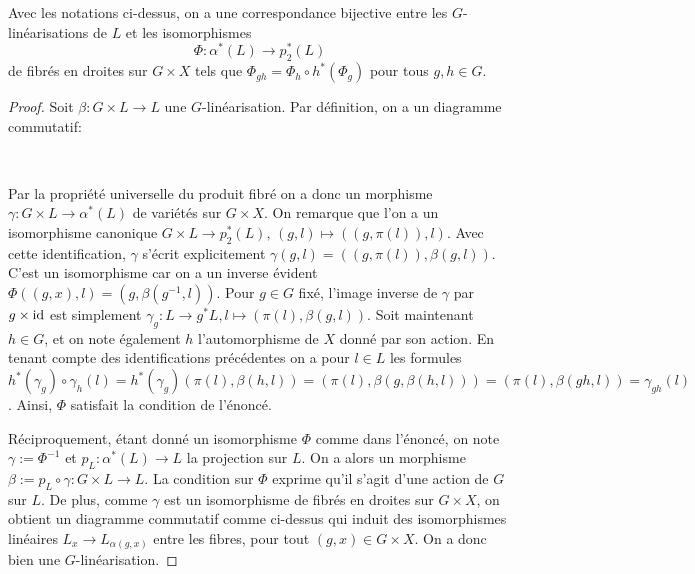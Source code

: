 \begin{lem}\label{CritereExistenceGLin}
Avec les notations ci-dessus, on a une correspondance bijective entre les $G$-linéarisations de $L$ et les isomorphismes
$$\Phi: \alpha^*(L)\rightarrow p_2^*(L)$$
de fibrés en droites sur $G\times X$ tels que $\Phi_{gh}=\Phi_h\circ h^*(\Phi_g)$ pour tous $g,h\in G$.
\end{lem}
\begin{proof}
Soit $\beta:G\times L\rightarrow L$ une $G$-linéarisation. Par définition, on a un diagramme commutatif:
	\begin{center}
	\\
	\end{center}
Par la propriété universelle du produit fibré on a donc un morphisme $\gamma:G\times L\rightarrow\alpha^*(L)$ de variétés sur $G\times X$. On remarque que l'on a un isomorphisme canonique $G\times L\rightarrow p_2^*(L),\, (g,l)\mapsto ((g,\pi (l)),l)$. Avec cette identification, $\gamma$ s'écrit explicitement $\gamma(g,l)=((g,\pi(l)),\beta(g,l))$. C'est un isomorphisme car on a un inverse évident $\Phi((g,x),l)=(g,\beta(g^{-1},l))$. Pour $g\in G$ fixé, l'image inverse de $\gamma$ par $g\times \operatorname{id}$ est simplement $\gamma_g:L\rightarrow g^*L, l\mapsto (\pi(l),\beta(g,l))$. Soit maintenant $h\in G$, et on note également $h$ l'automorphisme de $X$ donné par son action. En tenant compte des identifications précédentes on a pour $l\in L$ les formules $h^*(\gamma_g)\circ\gamma_h(l)=h^*(\gamma_g)(\pi(l),\beta(h,l))=(\pi(l),\beta(g,\beta(h,l)))=(\pi(l),\beta(gh,l))=\gamma_{gh}(l)$. Ainsi, $\Phi$ satisfait la condition de l'énoncé.

Réciproquement, étant donné un isomorphisme $\Phi$ comme dans l'énoncé, on note $\gamma:=\Phi^{-1}$ et $p_L:\alpha^*(L)\rightarrow L$ la projection sur $L$. On a alors un morphisme $\beta:=p_L\circ\gamma : G\times L \rightarrow L$. La condition sur $\Phi$ exprime qu'il s'agit d'une action de $G$  sur $L$. De plus, comme $\gamma$ est un isomorphisme de fibrés en droites sur $G\times X$, on obtient un diagramme commutatif comme ci-dessus qui induit des isomorphismes linéaires $L_x\rightarrow L_{\alpha(g,x)}$ entre les fibres, pour tout $(g,x)\in G\times X$. On a donc bien une $G$-linéarisation.
\end{proof}

